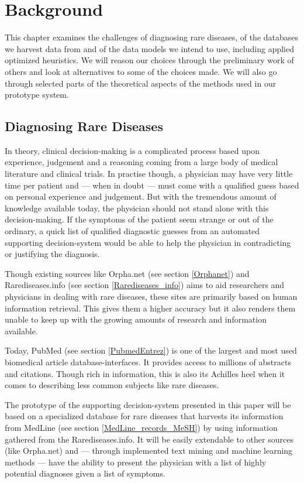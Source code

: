\chapter{Background\label{Background}}

This chapter examines the challenges of diagnosing rare diseases, of
the databases we harvest data from and of the data models we intend to
use, including applied optimized heuristics. We will reason our
choices through the preliminary work of others and look at
alternatives to some of the choices made. We will also go through
selected parts of the theoretical aspects of the methods used in our prototype
system.

\section{Diagnosing Rare Diseases}

In theory, clinical decision-making is a complicated process based upon
experience, judgement and a reasoning coming from a large body of
medical literature and clinical trials. In practise though, a
physician may have very little time per patient and --- when in doubt
--- must come with a qualified guess based on personal experience and
judgement. But with the tremendous amount of knowledge available today, the
physician should not stand alone with this decision-making. If the
symptoms of the patient seem strange or out of the ordinary, a quick
list of qualified diagnostic guesses from an automated supporting
decision-system would be able to help the physician in contradicting or
justifying the diagnosis.

Though existing sources like Orpha.net (see section \ref{Orphanet})
and Rarediseases.info (see section \ref{Rarediseases_info}) aims to
aid researchers and physicians in dealing with rare diseases, these
sites are primarily based on human information retrieval. This gives
them a higher accuracy but it also renders them unable to keep up with
the growing amounts of research and information available.

Today, PubMed (see section \ref{PubmedEntrez}) is one of the largest and most used
biomedical article database-interfaces. It provides access to millions
of abstracts and citations. Though rich in information, this is
also its Achilles heel when it comes to describing less common
subjects like rare diseases.

The prototype of the supporting decision-system presented in this
paper will be based on a specialized database for rare diseases that
harvests its information from MedLine (see section
\ref{MedLine_records_MeSH}) by using information gathered from the
Rarediseases.info. It will be easily extendable to other sources (like
Orpha.net) and --- through implemented text mining and machine
learning methods --- have the ability to present the physician with a
list of highly potential diagnoses given a list of symptoms.

